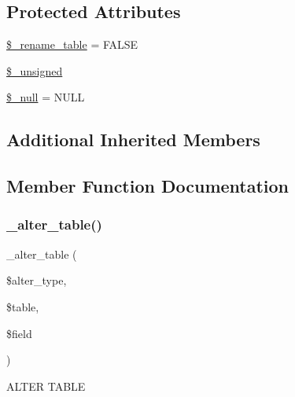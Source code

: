\subsection*{Protected Attributes}
\begin{DoxyCompactItemize}
\item 
\mbox{\hyperlink{class_c_i___d_b__pdo__firebird__forge_a1a649e7cf9de16bcf932977b18bc91de}{\$\+\_\+rename\+\_\+table}} = F\+A\+L\+SE
\item 
\mbox{\hyperlink{class_c_i___d_b__pdo__firebird__forge_aae977ae6d61fa183f0b25422b6ddc31c}{\$\+\_\+unsigned}}
\item 
\mbox{\hyperlink{class_c_i___d_b__pdo__firebird__forge_ae58fe6a5104d4a069a49b27533ce808f}{\$\+\_\+null}} = \textquotesingle{}N\+U\+LL\textquotesingle{}
\end{DoxyCompactItemize}
\subsection*{Additional Inherited Members}


\subsection{Member Function Documentation}
\mbox{\label{class_c_i___d_b__pdo__firebird__forge_a41c6cae02f2fda8b429ad0afb9509426}} 
\subsubsection{\texorpdfstring{\+\_\+alter\+\_\+table()}{\_alter\_table()}}
{\footnotesize\ttfamily \+\_\+alter\+\_\+table (\begin{DoxyParamCaption}\item[{}]{\$alter\+\_\+type,  }\item[{}]{\$table,  }\item[{}]{\$field }\end{DoxyParamCaption})\hspace{0.3cm}{\ttfamily [protected]}}

A\+L\+T\+ER T\+A\+B\+LE


